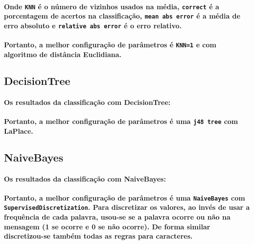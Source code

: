\documentclass[a4paper,10pt]{article}
\theoremstyle{plain}
\begin{document}


\paragraph{
  Onde \texttt{KNN} é o número de vizinhos usados na média, \texttt{correct} é a porcentagem de
  acertos na classificação, \texttt{mean abs error} é a média de erro absoluto e \texttt{relative
  abs error} é o erro relativo.
}

\paragraph{
  Portanto, a melhor configuração de parâmetros é \texttt{KNN=1} e com algoritmo de distância
  Euclidiana.
}

\subsection{DecisionTree}

\paragraph{
  Os resultados da classificação com DecisionTree:
}



\paragraph{
  Portanto, a melhor configuração de parâmetros é uma \texttt{j48 tree} com LaPlace.
}

\subsection{NaiveBayes}

\paragraph{
  Os resultados da classificação com NaiveBayes:
}



\paragraph{
  Portanto, a melhor configuração de parâmetros é uma \texttt{NaiveBayes} com
  \texttt{SupervisedDiscretization}. Para discretizar os valores, ao invés de usar a frequência de
  cada palavra, usou-se se a palavra ocorre ou não na mensagem (1 se ocorre e 0 se não ocorre). De
  forma similar discretizou-se também todas as regras para caracteres.
}
\end{document}
